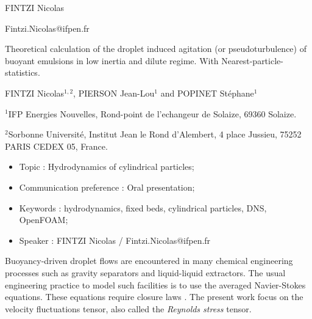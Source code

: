 \documentclass[a4paper,11pt]{article}
\author{\large GAMET Lionel}
\author{\large PIERSON Jean-Lou}
\author{\large GAMET Lionel$^1$, PIERSON Jean-Lou$^2$ and FINTZI Nicolas$^3$}
\theoremstyle{mytheoremstyle}
\theoremstyle{mytheoremstyle}
\theoremstyle{myproblemstyle}
\begin{document}
\begin{flushright}
    FINTZI Nicolas
    
    Fintzi.Nicolas@ifpen.fr
\end{flushright}
\begin{center}
    \vspace{10pt}
    {\Large Theoretical calculation of the droplet induced agitation (or pseudoturbulence) of buoyant emulsions in low inertia and dilute regime.
    With Nearest-particle-statistics.}\\
    \vspace{10pt}

    \vspace{15pt}
    {\large FINTZI Nicolas$^{1,2}$, PIERSON Jean-Lou$^1$ and POPINET St\'ephane$^1$}
\end{center}

\begin{flushleft}
$^{1}$\large IFP Energies Nouvelles, Rond-point de l’echangeur de Solaize, 69360 Solaize.

$^{2}$\large Sorbonne Universit\'e, Institut Jean le Rond d'Alembert, 4 place Jussieu, 75252 PARIS CEDEX 05, France.




\end{flushleft}
\begin{itemize}
\item Topic : Hydrodynamics of cylindrical particles;
\item Communication preference : Oral presentation;
\item Keywords : hydrodynamics, fixed beds, cylindrical particles, DNS, OpenFOAM;
\item Speaker : FINTZI Nicolas / Fintzi.Nicolas@ifpen.fr
\end{itemize}


\vspace{15pt}

Buoyancy-driven droplet flows are encountered in many chemical engineering processes such as gravity separators and liquid-liquid extractors. 
The usual engineering practice to model such facilities is to use the averaged Navier-Stokes equations. 
These equations require closure laws \citep{jackson1997locally}. 
The present work focus on the velocity fluctuations tensor, also called the \textit{Reynolds stress} tensor. 
\end{document}
